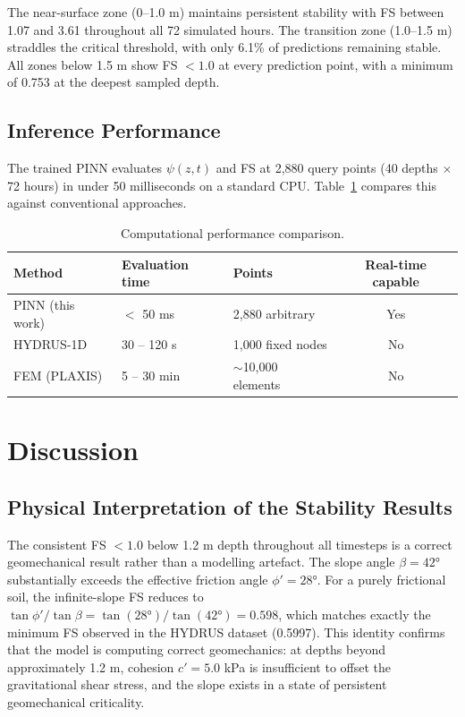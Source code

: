\documentclass[12pt]{report}
\begin{document}
The near-surface zone (0--1.0 m) maintains persistent stability with
FS between 1.07 and 3.61 throughout all 72 simulated hours.
The transition zone (1.0--1.5 m) straddles the critical threshold,
with only 6.1\% of predictions remaining stable. All zones below
1.5 m show FS $< 1.0$ at every prediction point, with a minimum
of 0.753 at the deepest sampled depth.

\subsection{Inference Performance}

The trained PINN evaluates $\psi(z,t)$ and FS at 2,880 query points
(40 depths $\times$ 72 hours) in under 50 milliseconds on a standard
CPU. Table~\ref{tab:performance} compares this against conventional
approaches.

\begin{table}[htbp]
\centering
\begin{tabular}{lllc}
\hline
\textbf{Method} & \textbf{Evaluation time} &
\textbf{Points} & \textbf{Real-time capable} \\
\hline
PINN (this work)   & $<$ 50 ms     & 2,880 arbitrary & Yes \\
HYDRUS-1D          & 30 -- 120 s   & 1,000 fixed nodes & No \\
FEM (PLAXIS)       & 5 -- 30 min   & $\sim$10,000 elements & No \\
\hline
\end{tabular}
\caption{Computational performance comparison.}
\label{tab:performance}
\end{table}

\section{Discussion}

\subsection{Physical Interpretation of the Stability Results}

The consistent FS $< 1.0$ below 1.2 m depth throughout all
timesteps is a correct geomechanical result rather than a modelling
artefact. The slope angle $\beta = 42°$ substantially exceeds the
effective friction angle $\phi' = 28°$. For a purely frictional
soil, the infinite-slope FS reduces to $\tan\phi'/\tan\beta =
\tan(28°)/\tan(42°) = 0.598$, which matches exactly the minimum
FS observed in the HYDRUS dataset (0.5997). This identity confirms
that the model is computing correct geomechanics: at depths beyond
approximately 1.2 m, cohesion $c' = 5.0$ kPa is insufficient to
offset the gravitational shear stress, and the slope exists in a
state of persistent geomechanical criticality.
\end{document}
